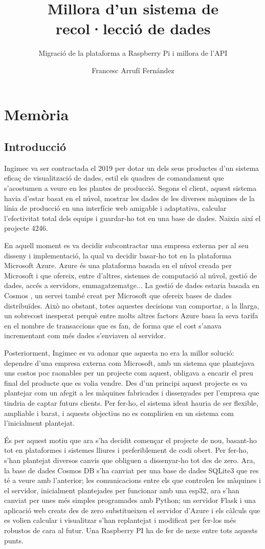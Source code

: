 \documentclass{tfgitic}[2022/06/30]
\title{Millora d'un sistema de recol·lecció de dades}
\subtitle{Migració de la plataforma a Raspberry Pi i millora de l'API}
\author{Francesc Arrufí Fernández}
\begin{document}
\listoffigures\listoftables

\part{Memòria}

\chapter{Introducció}
Ingimec va ser contractada el 2019 per dotar un dels seus productes d'un sistema eficaç de
visualització de dades, estil els quadres de comandament que s'acostumen a veure en les plantes
de producció. Segons el client, aquest sistema havia d'estar basat en el núvol, mostrar les dades
de les diverses màquines de la línia de producció en una interfície web amigable i adaptativa,
calcular l'efectivitat total dels equips i guardar-ho tot en una base de dades. Naixia així el
projecte 4246.

En aquell moment es va decidir subcontractar una empresa externa per al seu disseny i
implementació, la qual va decidir basar-ho tot en la plataforma Microsoft Azure. Azure és una
plataforma basada en el núvol creada per Microsoft i que ofereix, entre d'altres, sistemes de
computació al núvol, gestió de dades, accés a servidors, emmagatzematge... La gestió de dades
estaria basada en Cosmos , un servei també creat per Microsoft que ofereix bases de dades
distribuïdes. Això no obstant, totes aquestes decisions van comportar, a la llarga, un sobrecost
inesperat perquè entre molts altres factors Azure basa la seva tarifa en el nombre de
transaccions que es fan, de forma que el cost s'anava incrementant com més dades s'enviaven
al servidor.

Posteriorment, Ingimec es va adonar que aquesta no era la millor solució: dependre
d'una empresa externa com Microsoft, amb un sistema que plantejava uns costos poc raonables
per un projecte com aquest, obligava a encarir el preu final del producte que es volia vendre.
Des d'un principi aquest projecte es va plantejar com un afegit a les màquines fabricades i
dissenyades per l'empresa que tindria de captar futurs clients. Per fer-ho, el sistema ideat
hauria de ser flexible, ampliable i barat, i aquests objectius no es complirien en un sistema
com l'inicialment plantejat.

És per aquest motiu que ara s'ha decidit començar el projecte de nou, basant-ho tot en
plataformes i sistemes lliures i preferiblement de codi obert. Per fer-ho, s'han plantejat diversos
canvis que obliguen a dissenyar-ho tot des de zero. Ara, la base de dades Cosmos DB s'ha
canviat per una base de dades SQLite3 que res té a veure amb l'anterior; les comunicacions
entre els  que controlen les màquines i el servidor, inicialment plantejades per funcionar
amb una esp32, ara s'han canviat per unes més simples programades amb Python; un servidor
Flask i una aplicació web creats des de zero substitueixen el servidor d'Azure i els càlculs que
es volien calcular i visualitzar s'han replantejat i modificat per fer-los més robustos de cara al
futur. Una Raspberry PI ha de fer de nexe entre tots aquests punts.
\end{document}

